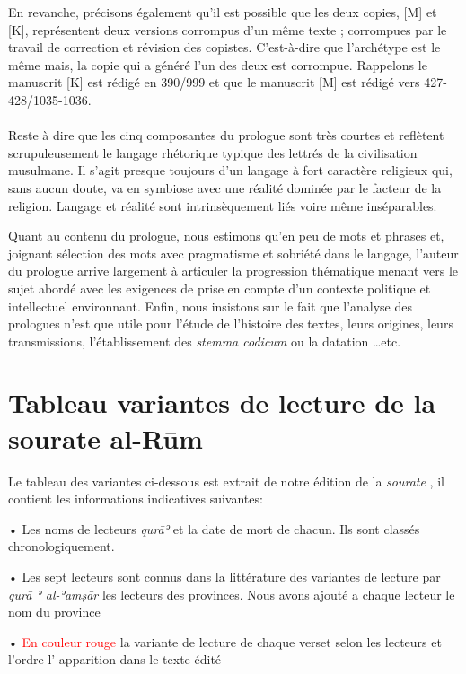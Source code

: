 \documentclass[a4paper,12pt]{report}
\begin{document}
\begin{itemize}
\begin{enumerate}
  En revanche,  précisons également qu’il est possible que les deux copies, [M] et [K], représentent  deux versions  corrompus d’un même texte ; corrompues par le travail de correction et révision des copistes. C’est-à-dire que l’archétype est le même mais, la copie qui a généré l'un des deux est corrompue. Rappelons le manuscrit  [K] est rédigé en 390/999 et que le manuscrit [M] est rédigé vers 427-428/1035-1036.  
\paragraph{}

Reste à dire que les cinq composantes du prologue sont  très courtes et reflètent scrupuleusement le langage rhétorique typique des lettrés de la civilisation musulmane. Il s’agit presque toujours d’un langage  à fort caractère  religieux qui, sans aucun doute, va en symbiose avec une réalité dominée par le facteur de la religion. Langage et réalité sont intrinsèquement liés voire même inséparables.

Quant au contenu du prologue, nous estimons qu’en peu de mots et phrases et, joignant sélection des mots avec pragmatisme et sobriété dans le langage, l’auteur du prologue arrive largement à articuler la progression thématique menant vers le sujet abordé avec les exigences de prise en compte d’un contexte politique et intellectuel environnant. Enfin, nous insistons sur le fait que l’analyse des prologues n’est que utile pour l’étude de l’histoire des textes, leurs origines, leurs transmissions,  l’établissement des \textit{stemma codicum}  ou la datation …etc. 

  

\newpage
\section{Tableau variantes de lecture de la sourate al-Rūm}


Le tableau des variantes  ci-dessous est extrait de notre édition de la \textit{sourate }, il contient les informations indicatives suivantes: 

•	Les noms de lecteurs \textit{qurāʾ} et la date de mort de chacun. Ils sont classés chronologiquement. 


• Les sept lecteurs sont connus dans la littérature des variantes de lecture par  \textit{qurā ʾ al-ʾamṣār } les lecteurs des provinces. Nous avons ajouté a chaque  lecteur le nom du province   


•	\textcolor{red}{En couleur rouge} la variante de lecture  de chaque verset selon les lecteurs et l'ordre l' apparition dans le texte édité 


\end{enumerate}
\end{itemize}
\end{document}
